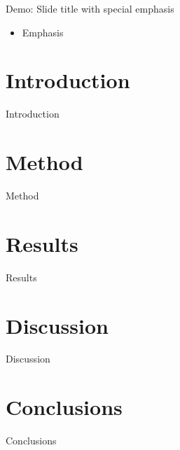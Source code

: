 \documentclass{beamer}
\begin{document}
\begin{frame}{Demo: Slide title with special emphasis}
\begin{itemize}
\item Emphasis 
\end{itemize}
\end{frame}

\section{Introduction}
\begin{frame}{Introduction}
\end{frame}

\section{Method}
\begin{frame}{Method}
\end{frame}

\section{Results}
\begin{frame}{Results}
\end{frame}

\section{Discussion}
\begin{frame}{Discussion}
\end{frame}

\section{Conclusions}
\begin{frame}{Conclusions}
\end{frame}
\end{document}
